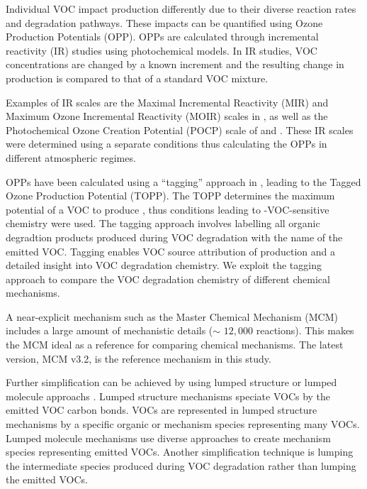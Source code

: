 Individual VOC impact  production differently due to their diverse reaction rates and degradation pathways. 
These impacts can be quantified using Ozone Production Potentials (OPP).
OPPs are calculated through incremental reactivity (IR) studies using photochemical models. 
In IR studies, VOC concentrations are changed by a known increment and the resulting change in  production is compared to that of a standard VOC mixture. 

Examples of IR scales are the Maximal Incremental Reactivity (MIR) and Maximum Ozone Incremental Reactivity (MOIR) scales in \citet{Carter:1994}, as well as the Photochemical Ozone Creation Potential (POCP) scale of \citet{Derwent:1996} and \citet{Derwent:1998}. 
These IR scales were determined using a separate  conditions thus calculating the OPPs in different atmospheric regimes.

OPPs have been calculated using a ``tagging'' approach in \citet{Butler:2011}, leading to the Tagged Ozone Production Potential (TOPP). 
The TOPP determines the maximum potential of a VOC to produce , thus  conditions leading to -VOC-sensitive chemistry were used.
The tagging approach involves labelling all organic degradtion products produced during VOC degradation with the name of the emitted VOC.
Tagging enables VOC source attribution of  production and a detailed insight into VOC degradation chemistry.
We exploit the tagging approach to compare the VOC degradation chemistry of different chemical mechanisms. 

A near-explicit mechanism such as the Master Chemical Mechanism (MCM) \citep{Jenkin:2003, Saunders:2003, Bloss:2005} includes a large amount of mechanistic details ($\sim$ $12,000$ reactions). 
This makes the MCM ideal as a reference for comparing chemical mechanisms.
The latest version, MCM v3.2, \citep{MCM_Site} is the reference mechanism in this study.

Further simplification can be achieved by using lumped structure or lumped molecule approachs \citep{Dodge:2000}. 
Lumped structure mechanisms speciate VOCs by the emitted VOC carbon bonds.
VOCs are represented in lumped structure mechanisms by a specific organic or mechanism species representing many VOCs. 
Lumped molecule mechanisms use diverse approaches to create mechanism species representing emitted VOCs.  
Another simplification technique is lumping the intermediate species produced during VOC degradation rather than lumping the emitted VOCs.

